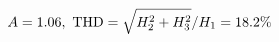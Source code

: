 \documentclass[preview]{standalone}
\begin{document}
\begin{align*}
\special{dvisvgm:raw <g id='unique000'>}A=1.06,\ \text{THD}=\sqrt{H_2^2+H_3^2}/H_1=18.2\%\special{dvisvgm:raw </g>}
\end{align*}
\end{document}
